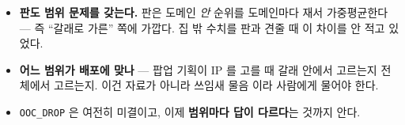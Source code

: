 \documentclass[11pt]{article}
\begin{document}
\begin{itemize}
\item \textbf{판도 범위 문제를 갖는다.} 판은 도메인 \emph{안} 순위를
도메인마다 재서 가중평균한다 --- 즉 ``갈래로 가른'' 쪽에 가깝다. 집 밖
수치를 판과 견줄 때 이 차이를 안 적고 있었다.
\item \textbf{어느 범위가 배포에 맞나} --- 팝업 기획이 IP 를 고를 때
갈래 안에서 고르는지 전체에서 고르는지. 이건 자료가 아니라 쓰임새 물음
이라 사람에게 물어야 한다.
\item \texttt{OOC\_DROP} 은 여전히 미결이고, 이제 \textbf{범위마다 답이
다르다}는 것까지 안다.
\end{itemize}
\end{document}
